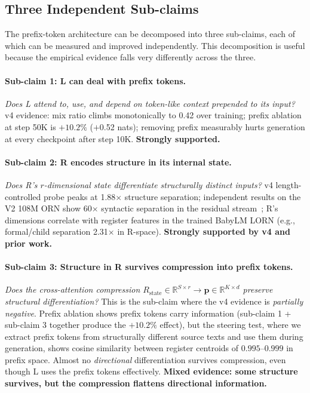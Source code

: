 \documentclass[11pt, a4paper]{article}
\theoremstyle{plain}
\theoremstyle{definition}
\theoremstyle{remark}
\begin{document}
\subsection{Three Independent Sub-claims}
\label{sec:three-subclaims}

The prefix-token architecture can be decomposed into three sub-claims, each of which can be measured and improved independently.
This decomposition is useful because the empirical evidence falls very differently across the three.

\paragraph{Sub-claim 1: L can deal with prefix tokens.}
\emph{Does L attend to, use, and depend on token-like context prepended to its input?}
v4 evidence: mix ratio climbs monotonically to 0.42 over training; prefix ablation at step 50K is $+10.2\%$ ($+$0.52 nats); removing prefix measurably hurts generation at every checkpoint after step 10K.
\textbf{Strongly supported.}

\paragraph{Sub-claim 2: R encodes structure in its internal state.}
\emph{Does R's $r$-dimensional state differentiate structurally distinct inputs?}
v4 length-controlled probe peaks at 1.88$\times$ structure separation; independent results on the V2 108M ORN show 60$\times$ syntactic separation in the residual stream~\cite{orn_lab_notebook}; R's dimensions correlate with register features in the trained BabyLM LORN (e.g., formal/child separation 2.31$\times$ in R-space).
\textbf{Strongly supported by v4 and prior work.}

\paragraph{Sub-claim 3: Structure in R survives compression into prefix tokens.}
\emph{Does the cross-attention compression $R_{\text{state}} \in \mathbb{R}^{S\times r} \to \mathbf{p} \in \mathbb{R}^{K\times d}$ preserve structural differentiation?}
This is the sub-claim where the v4 evidence is \emph{partially negative}.
Prefix ablation shows prefix tokens carry information (sub-claim 1 + sub-claim 3 together produce the $+10.2\%$ effect), but the steering test, where we extract prefix tokens from structurally different source texts and use them during generation, shows cosine similarity between register centroids of $0.995$--$0.999$ in prefix space.
Almost no \emph{directional} differentiation survives compression, even though L uses the prefix tokens effectively.
\textbf{Mixed evidence: some structure survives, but the compression flattens directional information.}
\end{document}
